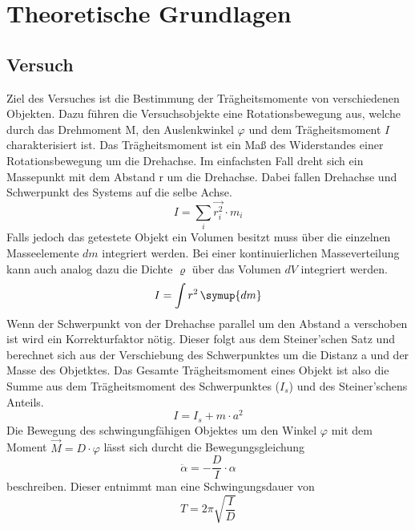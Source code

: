 \section{Theoretische Grundlagen}
\label{sec:Theorie}
\subsection{Versuch}

Ziel des Versuches ist die Bestimmung der Trägheitsmomente von verschiedenen Objekten. Dazu führen die Versuchsobjekte eine Rotationsbewegung aus, welche durch das Drehmoment M, den Auslenkwinkel $\varphi$ und dem Trägheitsmoment $I$ charakterisiert ist.
\newline \newline
Das Trägheitsmoment ist ein Maß des Widerstandes einer Rotationsbewegung um die Drehachse. Im einfachsten Fall dreht sich ein Massepunkt mit dem Abstand r um die Drehachse. Dabei fallen Drehachse und Schwerpunkt des Systems auf die selbe Achse.
\begin{equation}
	I = \sum_i \vec{r_i^2}  \cdot  m_i
\end{equation}   
Falls jedoch das getestete Objekt ein Volumen besitzt muss über die einzelnen Masseelemente $dm$ integriert werden. Bei einer kontinuierlichen Masseverteilung kann auch analog dazu die Dichte $\varrho$ über das Volumen $dV$ integriert werden. 
\begin{equation}
	I = \int{ r^2 \, \symup{dm}}
\end{equation}
Wenn der Schwerpunkt von der Drehachse parallel um den Abstand a verschoben ist wird ein Korrekturfaktor nötig. Dieser folgt aus dem Steiner'schen Satz und berechnet sich aus der Verschiebung des Schwerpunktes um die Distanz a und der Masse des Objetktes. Das Gesamte Trägheitsmoment eines Objekt ist also die Summe aus dem Trägheitsmoment des Schwerpunktes ($I_s$) und des Steiner'schens Anteils.
\begin{equation}
	\label{eqn:Steiner}
	I = I_s + m  \cdot a^2
\end{equation} 
Die Bewegung des schwingungfähigen Objektes um den Winkel $\varphi$ mit dem Moment $\vec{M} = D \cdot  \varphi$ lässt sich durcht die  Bewegungsgleichung 
\begin{equation}
\ddot{\alpha}= - \frac{D}{I} \cdot \alpha
\end{equation}
beschreiben. Dieser entnimmt man eine Schwingungsdauer von 
\begin{equation}
	\label{eqn:Schwingungsdauer}
	T = 2 \pi \sqrt{\frac{I}{D}} 
\end{equation}

